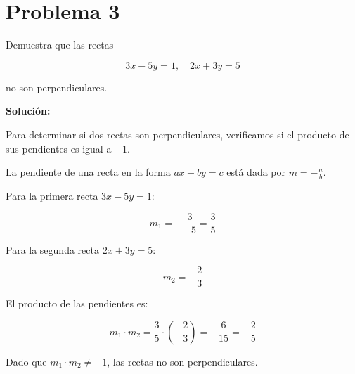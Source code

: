 \section*{Problema 3}

Demuestra que las rectas

\[
3x - 5y = 1, \quad 2x + 3y = 5
\]

no son perpendiculares.

\textbf{Solución:}

Para determinar si dos rectas son perpendiculares, verificamos si el producto de sus pendientes es igual a $-1$.

La pendiente de una recta en la forma $ax + by = c$ está dada por $m = -\frac{a}{b}$.

Para la primera recta $3x - 5y = 1$:

\[
m_1 = -\frac{3}{-5} = \frac{3}{5}
\]

Para la segunda recta $2x + 3y = 5$:

\[
m_2 = -\frac{2}{3}
\]

El producto de las pendientes es:

\[
m_1 \cdot m_2 = \frac{3}{5} \cdot \left(-\frac{2}{3}\right) = -\frac{6}{15} = -\frac{2}{5}
\]

Dado que $m_1 \cdot m_2 \neq -1$, las rectas no son perpendiculares.